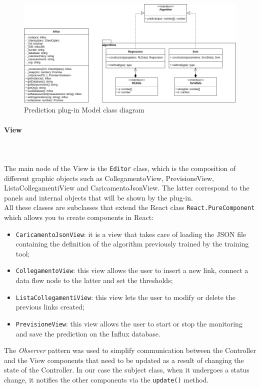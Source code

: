 \begin{figure}[H]
\centering
\includegraphics[scale=0.45]{../../../Diagrams/Classes_diagrams/plugin_model.png}
\caption{Prediction plug-in Model class diagram}
\end{figure}

\paragraph{View}\mbox{} \\ \mbox{} \\
The main node of the View is the \texttt{Editor} class, which is the composition of different graphic objects such as CollegamentoView, PrevisioneView, ListaCollegamentiView and CaricamentoJsonView. The latter correspond to the panels and internal objects that will be shown by the plug-in. \\
All these classes are subclasses that extend the React class \texttt{React.PureComponent} which allows you to create components in React:
\begin{itemize}
\item \texttt{CaricamentoJsonView}: it is a view that takes care of loading the JSON file containing the definition of the algorithm previously trained by the training tool;
\item \texttt{CollegamentoView}: this view allows the user to insert a new link, connect a data flow node to the latter and set the thresholds;
\item \texttt{ListaCollegamentiView}: this view lets the user to modify or delete the previous links created;
\item \texttt{PrevisioneView}: this view allows the user to start or stop the monitoring and save the prediction on the Influx database.
\end{itemize}
The \textit{Observer} pattern was used to simplify communication between the Controller and the View components that need to be updated as a result of changing the state of the Controller. In our case the subject class, when it undergoes a status change, it notifies the other components via the \texttt{update()} method.

